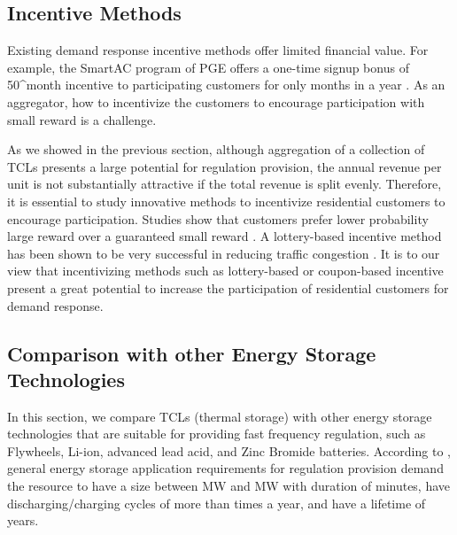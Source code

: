 \documentclass[onecolumn,journal]{IEEEtran}
\begin{document}
\begin{table}[tb]
\subsection{Incentive Methods}
Existing demand response incentive methods offer limited financial value. For example, the SmartAC program of PGE offers a one-time signup bonus of 50^\text{\textregistered}\/month incentive to participating customers for only  months in a year  \cite{OnCall}. As an aggregator, how to incentivize the customers to encourage participation with small reward is a challenge. 

As we showed in the previous section, although aggregation of a collection of \acp{TCL} presents a large potential for regulation provision, the annual revenue  per unit is not substantially attractive if the total revenue is split evenly. Therefore, it is essential to study innovative methods to incentivize residential customers to encourage participation. Studies show that customers prefer lower probability large reward over a guaranteed small reward \cite{kahneman1979prospect}. A lottery-based incentive method has been shown to be very successful in reducing traffic congestion \cite{merugu2009incentive}. It is to our view that incentivizing methods such as lottery-based \cite{merugu2009incentive} or coupon-based  \cite{zhong2013coupon} incentive present a great potential to increase the participation of residential customers for demand response.


\subsection{Comparison with other Energy Storage Technologies}\label{sec:comparison}
In this section, we compare TCLs (thermal storage) with other energy storage technologies that are suitable for providing fast frequency regulation, such as Flywheels, Li-ion, advanced lead acid,  and Zinc Bromide batteries.  According to \cite{rastler2010electricity}, general energy storage application requirements for regulation provision demand the resource to have a size between  MW and  MW with duration of  minutes, have  discharging/charging cycles of more than  times a year, and have a lifetime of  years. 


\end{table}
\end{document}
